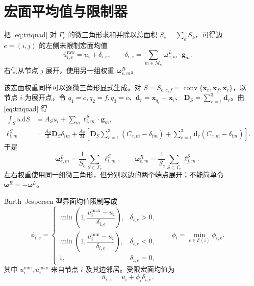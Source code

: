 \documentclass[UTF8,a4paper,11pt,openany]{ctexrep}
\numberwithin{equation}{chapter}
\newcommand{\dd}{\,\mathrm d}
\begin{document}
\section{宏面平均值与限制器}

把 \cref{eq:triquad} 对 $\Gamma_e$ 的微三角形求和并除以总面积 $S_e=\sum_kS_k$，可得边 $e=(i,j)$ 的左侧未限制宏面均值
\begin{equation}
 \overline u_{i,e}^{\mathrm{raw}}
  =u_i+\delta_{i,e},\qquad
  \delta_{i,e}=\sum_{m\in\mathcal M_e}
  \bm\omega^{L}_{e,m}\cdot\bm g_m.
  \label{eq:facemean}
\end{equation}
右侧从节点 $j$ 展开，使用另一组权重 $\bm\omega^{R}_{e,m}$。

该宏面权重同样可以逐微三角形显式生成。对
$S=S_{e,c,f}=\operatorname{conv}\{\bm x_e,\bm x_f,\bm x_c\}$，以节点 $i$ 为展开点，令
$q_1=e,q_2=f,q_3=c$、$\bm d_r=\bm x_{q_r}-\bm x_i$、
$\bm D_S=\sum_{r=1}^{3}\bm d_r$。由 \cref{eq:triquad} 得
\begin{align}
  \int_Su\dd S
  &=A_Su_i+\sum_m\bm\ell^S_{i,m}\cdot\bm g_m,\\
  \bm\ell^S_{i,m}
  &=\frac{A_S}{3}\bm D_S\delta_{im}
  +\frac{A_S}{24}\left[
    \bm D_S\sum_{r=1}^{3}(C_{r,m}-\delta_{im})
    +\sum_{r=1}^{3}\bm d_r(C_{r,m}-\delta_{im})
  \right].
  \label{eq:triangle-explicit-node-weight}
\end{align}
于是
\begin{equation}
  \boxed{
  \bm\omega^L_{e,m}
  =\frac1{S_e}\sum_{S\subset\Gamma_e}\bm\ell^S_{i,m},
  \qquad
  \bm\omega^R_{e,m}
  =\frac1{S_e}\sum_{S\subset\Gamma_e}\bm\ell^S_{j,m}.}
  \label{eq:macroface-weight-from-dual}
\end{equation}
左右权重使用同一组微三角形，但分别以边的两个端点展开；不能简单令
$\bm\omega^R=-\bm\omega^L$。

Barth--Jespersen 型界面均值限制写成
\begin{equation}
  \phi_{i,e}=\begin{cases}
  \min\left(1,\dfrac{u_i^{\max}-u_i}{\delta_{i,e}}\right),&\delta_{i,e}>0,\\[0.8em]
  \min\left(1,\dfrac{u_i^{\min}-u_i}{\delta_{i,e}}\right),&\delta_{i,e}<0,\\
  1,&\delta_{i,e}=0,
  \end{cases}
  \qquad
  \phi_i=\min_{e\in\mathcal E(i)}\phi_{i,e}.
  \label{eq:bj}
\end{equation}
其中 $u_i^{\min},u_i^{\max}$ 来自节点 $i$ 及其边邻居。受限宏面均值为
\begin{equation}
  \overline u_{i,e}=u_i+\phi_i\delta_{i,e}.
\end{equation}
\end{document}

